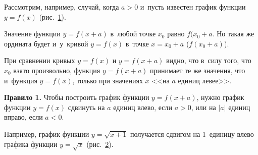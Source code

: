 
Рассмотрим, например, случай, когда $a > 0$ и~пусть известен график функции
$y = f(x)$ (рис.\ \ref{fig_1_10_20}).

\begin{figure}\label{fig_1_10_20}
\end{figure}

Значение функции $y = f(x + a)$ в~любой точке $x_{0}$ равно $f(x_{0} + a$.
Но такая же ордината будет и~у~кривой $y = f(x)$ в~точке $x = x_{0} + a$
($f(x_{0} + a)$).

При сравнении кривых $y = f(x)$ и $y = f(x + a)$ видно, что в~силу того,
что $x_{0}$ взято произвольно, функция $y = f(x + a)$ принимает те же значения,
что и~функция $y = f(x)$, только при значениях $x$ <<на $a$ единиц левее>>.

\textbf{Правило 1.} Чтобы построить график функции $y = f(x + a)$,
нужно график функции $y = f(x)$ сдвинуть на $a$ единиц влево,
если $a > 0$, или на $|a|$ единиц вправо, если $a < 0$.

\begin{figure}
\end{figure}

Например, график функции $y = \sqrt{x + 1}$ получается сдвигом на 1~единицу влево
графика функции $y = \sqrt{x}$ (рис.\ \ref{fig_1_10_21}).

\begin{figure}\label{fig_1_10_21}
\end{figure}


